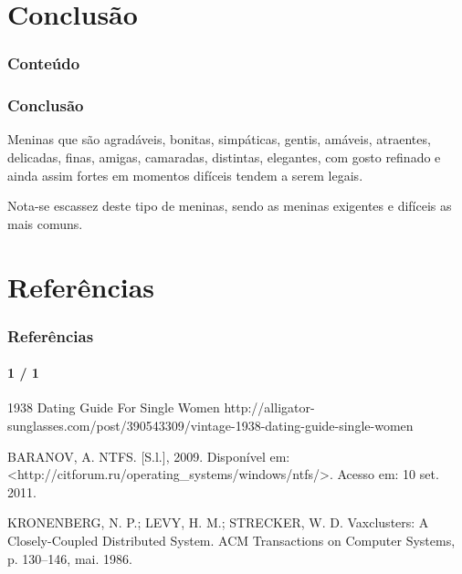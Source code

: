 \section{Conclusão}

\begin{frame}
	\frametitle{Conteúdo}
	\tableofcontents[currentsection]
\end{frame}


\begin{frame}
	\frametitle{Conclusão}

	\begin{block}{}
	Meninas que são agradáveis, bonitas, simpáticas, gentis, amáveis,
	atraentes, delicadas,
	finas, amigas, camaradas, distintas, elegantes, com gosto refinado e ainda
	assim fortes em momentos difíceis tendem a serem legais.
	\end{block}

	\begin{block}{}
	Nota-se escassez deste tipo de meninas, sendo as meninas exigentes e 
	difíceis as mais comuns.
	\end{block}
\end{frame}


\section*{Referências}

\begin{frame}
	\frametitle{Referências}
	\framesubtitle{1 / 1}

	\footnotesize
	1938 Dating Guide For Single Women
	http://alligator-sunglasses.com/post/390543309/vintage-1938-dating-guide-single-women
	\vspace{5 mm}

	BARANOV, A.  NTFS. [S.l.], 2009. Disponível em:
	<http://citforum.ru/operating\_systems/windows/ntfs/>. Acesso em: 10 set.
	2011.
	\vspace{5 mm}

	KRONENBERG, N. P.; LEVY, H. M.; STRECKER, W. D. Vaxclusters: A
	Closely-Coupled Distributed System. ACM Transactions on Computer Systems,
	p. 130–146, mai. 1986.
\end{frame}

